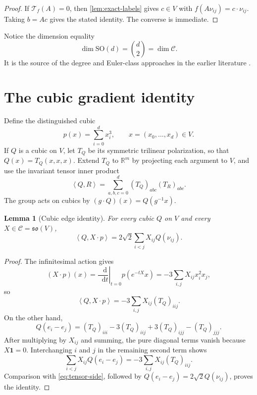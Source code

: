 \documentclass[11pt,reqno]{amsart}
\newtheorem{lemma}[theorem]{Lemma}
\theoremstyle{definition}
\theoremstyle{remark}
\newcommand{\R}{\mathbb R}
\newcommand{\one}{\mathbf 1}
\newcommand{\SO}{\mathrm{SO}}
\newcommand{\dd}{\mathop{}\!\mathrm d}
\newcommand{\cC}{\mathcal C}
\newcommand{\cT}{\mathcal T}
\newcommand{\ip}[2]{\left\langle #1,#2\right\rangle}
\begin{document}
\begin{proof}
If $\cT_f(A)=0$, then \cref{lem:exact-labels} gives $c\in V$ with
$f(A\nu_{ij})=c\cdot\nu_{ij}$.  Taking $b=Ac$ gives the stated identity.
The converse is immediate.
\end{proof}

Notice the dimension equality
\[
\dim\SO(d)=\binom d2=\dim\cC.
\]
It is the source of the degree and Euler-class approaches in the earlier
literature \cite{Kuperberg1999,HauselMakaiSzucs2000}.

\section{The cubic gradient identity}\label{sec:cubic}

Define the distinguished cubic
\begin{equation}\label{eq:distinguished-cubic}
p(x)=\sum_{i=0}^{d}x_i^3,
\qquad x=(x_0,\dots,x_d)\in V.
\end{equation}
If $Q$ is a cubic on $V$, let $T_Q$ be its symmetric trilinear polarization,
so that $Q(x)=T_Q(x,x,x)$.  Extend $T_Q$ to $\R^m$ by projecting each argument
to $V$, and use the invariant tensor inner product
\[
\ip{Q}{R}=\sum_{a,b,c=0}^{d}(T_Q)_{abc}(T_R)_{abc}.
\]
The group acts on cubics by $(g\cdot Q)(x)=Q(g^{-1}x)$.

\begin{lemma}[Cubic edge identity]\label{lem:cubic-edge-identity}
For every cubic $Q$ on $V$ and every $X\in\cC=\mathfrak{so}(V)$,
\begin{equation}\label{eq:cubic-edge-identity}
\ip{Q}{X\cdot p}
=2\sqrt2\sum_{i<j}X_{ij}Q(\nu_{ij}).
\end{equation}
\end{lemma}

\begin{proof}
The infinitesimal action gives
\[
(X\cdot p)(x)
=\left.\frac{\dd}{\dd t}\right|_{t=0}p(e^{-tX}x)
=-3\sum_{i,j}X_{ij}x_i^2x_j,
\]
so
\begin{equation}\label{eq:tensor-side}
\ip{Q}{X\cdot p}=-3\sum_{i,j}X_{ij}(T_Q)_{iij}.
\end{equation}
On the other hand,
\[
Q(e_i-e_j)
=(T_Q)_{iii}-3(T_Q)_{iij}+3(T_Q)_{ijj}-(T_Q)_{jjj}.
\]
After multiplying by $X_{ij}$ and summing, the pure diagonal terms vanish
because $X\one=0$.  Interchanging $i$ and $j$ in the remaining second term
shows
\[
\sum_{i<j}X_{ij}Q(e_i-e_j)
=-3\sum_{i,j}X_{ij}(T_Q)_{iij}.
\]
Comparison with \eqref{eq:tensor-side}, followed by
$Q(e_i-e_j)=2\sqrt2Q(\nu_{ij})$, proves the identity.
\end{proof}
\end{document}

